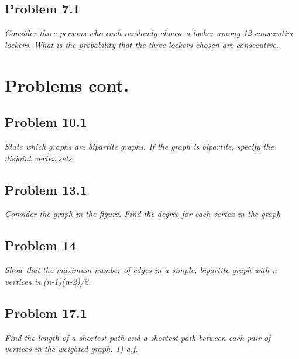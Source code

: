 \documentclass[
        ]{beamer}
\begin{document}
    \subsection{Problem 7.1}
        \begin{frame}[c]{\subsecname}
            \emph{Consider three persons who each randomly choose a locker among 12 consecutive
lockers. What is the probability that the three lockers chosen are consecutive.}\\\pause
        \end{frame}


\section{Problems cont.}
    \subsection{Problem 10.1}
        \begin{frame}[c]{\subsecname}
            \emph{State which graphs are bipartite graphs. If the graph is bipartite, specify the disjoint vertex sets}\\\pause
        \end{frame}



    \subsection{Problem 13.1}
        \begin{frame}[c]{\subsecname}
            \emph{Consider the graph in the figure. Find the degree for each vertex in the graph}\\\pause
        \end{frame}



    \subsection{Problem 14}
        \begin{frame}[c]{\subsecname}
            \emph{Show that the maximum number of edges in a simple, bipartite graph with n
vertices is (n-1)(n-2)/2.}\\\pause
        \end{frame}



    \subsection{Problem 17.1}
        \begin{frame}[c]{\subsecname}
            \emph{Find the length of a shortest path and a shortest path between each pair of
vertices in the weighted graph. 1) a,f.}\\\pause
        \end{frame}
\end{document}
